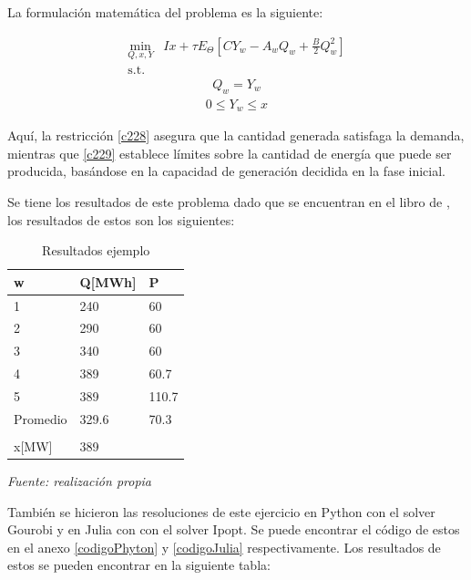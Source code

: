 La formulación matemática del problema es la siguiente:

\begin{equation}
\begin{array}{rrclcl}
    \displaystyle \min_{Q,x,Y} & Ix+\tau E_{\Theta}[CY_w-A_wQ_w+\frac{B}{2}Q_w^2]  \\\textrm{s.t.} \label{c227}
\end{array}
\end{equation}
\begin{equation}
\begin{array}{cl}
    Q_w=Y_w \label{c228}
\end{array}
\end{equation}
\begin{equation}
\begin{array}{cl}
   0\leq Y_w \leq x\label{c229}
\end{array}
\end{equation}

Aquí, la restricción \ref{c228} asegura que la cantidad generada satisfaga la demanda, mientras que \ref{c229} establece límites sobre la cantidad de energía que puede ser producida, basándose en la capacidad de generación decidida en la fase inicial.


\vspace{2.5mm}
Se tiene los resultados de este problema dado que se encuentran en el libro de , los resultados de estos son los siguientes:

\begin{table}[H]
\centering
\begin{tabular}{|l|l|l|}
\hline
w & Q{[}MWh{]} & P \\ \hline
1 & 240 & 60  \\ \hline
2 & 290 & 60  \\ \hline
3 & 340 & 60  \\ \hline
4 & 389 & 60.7 \\ \hline
5 & 389 & 110.7 \\ \hline
Promedio & 329.6 & 70.3 \\ \hline
 &  &     \\ \hline
x{[}MW{]}  & 389 &  \\ \hline

\end{tabular}
\caption{Resultados ejemplo}
\label{tabla:ejemplo}
\textit{Fuente: realización propia}
\end{table}

También se hicieron las resoluciones de este ejercicio  en Python con el solver Gourobi y en Julia con con el solver Ipopt. Se puede encontrar el código de estos en el anexo \ref{codigoPhyton} y \ref{codigoJulia} respectivamente.
\vspace{2.5mm}
Los resultados de estos se pueden encontrar en la siguiente tabla:


